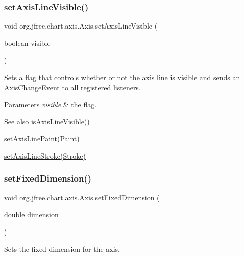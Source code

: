 \subsubsection{\texorpdfstring{set\+Axis\+Line\+Visible()}{setAxisLineVisible()}}
{\footnotesize\ttfamily void org.\+jfree.\+chart.\+axis.\+Axis.\+set\+Axis\+Line\+Visible (\begin{DoxyParamCaption}\item[{boolean}]{visible }\end{DoxyParamCaption})}

Sets a flag that controls whether or not the axis line is visible and sends an \mbox{\hyperlink{}{Axis\+Change\+Event}} to all registered listeners.


\begin{DoxyParams}{Parameters}
{\em visible} & the flag.\\
\hline
\end{DoxyParams}
\begin{DoxySeeAlso}{See also}
\mbox{\hyperlink{classorg_1_1jfree_1_1chart_1_1axis_1_1_axis_a3bf6fd211b960ee08ef22a66016d3786}{is\+Axis\+Line\+Visible()}} 

\mbox{\hyperlink{classorg_1_1jfree_1_1chart_1_1axis_1_1_axis_a8b7c2af897382eca7088d489f60db36d}{set\+Axis\+Line\+Paint(\+Paint)}} 

\mbox{\hyperlink{classorg_1_1jfree_1_1chart_1_1axis_1_1_axis_acb2ef4578aff9ebd3fff36596b86ad9a}{set\+Axis\+Line\+Stroke(\+Stroke)}} 
\end{DoxySeeAlso}
\mbox{\label{classorg_1_1jfree_1_1chart_1_1axis_1_1_axis_a1ab0c12e26c2468049d25e635988beec}} 
\subsubsection{\texorpdfstring{set\+Fixed\+Dimension()}{setFixedDimension()}}
{\footnotesize\ttfamily void org.\+jfree.\+chart.\+axis.\+Axis.\+set\+Fixed\+Dimension (\begin{DoxyParamCaption}\item[{double}]{dimension }\end{DoxyParamCaption})}

Sets the fixed dimension for the axis. 

